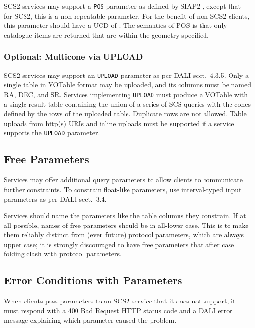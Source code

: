 \documentclass[11pt,a4paper]{ivoa}
\begin{document}
SCS2 services may support a \verb|POS| parameter as defined by SIAP2
\citep{2015ivoa.spec.1223D}, except that for SCS2, this is a
non-repeatable parameter.  For the benefit of non-SCS2 clients, this
parameter should have a UCD of .  The semantics of POS
is that only catalogue items are returned that are within the geometry
specified.

\subsubsection{Optional: Multicone via UPLOAD}

SCS2 services may support an \texttt{UPLOAD} parameter as per DALI
sect.~4.3.5.  Only a single table in VOTable format may be uploaded, and
its columns must be named RA, DEC, and SR.  Services implementing
\verb|UPLOAD|
must produce a VOTable with a single result table containing the union
of a series of SCS queries with the cones defined by the rows of the
uploaded table.  Duplicate rows are not allowed.  Table uploads from
http(s) URIs and inline uploads must be supported if a service supports
the \texttt{UPLOAD} parameter.



\subsection{Free Parameters}

Services may offer additional query parameters to allow clients to
communicate further constraints.  To constrain float-like parameters,
use interval-typed input parameters as per DALI sect.~3.4.

Services should name the parameters like the table columns they
constrain.  If at all possible, names of free parameters should be in
all-lower case.  This is to make them
reliably distinct from (even future) protocol
parameters, which are always upper case; it is strongly discouraged
to have free parameters that after case folding clash with protocol
parameters.

\subsection{Error Conditions with Parameters}

When clients pass parameters to an SCS2 service that it does not support,
it must respond with a 400 Bad Request HTTP status code and a DALI error
message explaining which parameter caused the problem.
\end{document}
